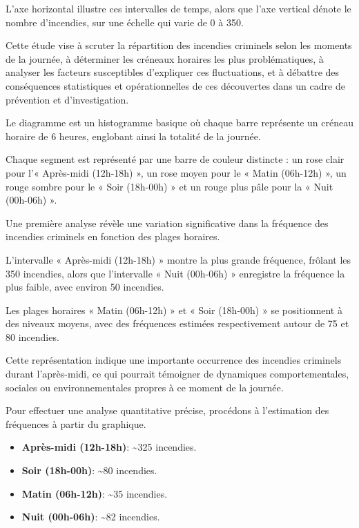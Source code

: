 \documentclass[
]{article}
\providecommand{\tightlist}{%
  \setlength{\itemsep}{0pt}\setlength{\parskip}{0pt}}
\begin{document}
L'axe horizontal illustre ces intervalles de temps, alors que l'axe
vertical dénote le nombre d'incendies, sur une échelle qui varie de 0 à
350.

Cette étude vise à scruter la répartition des incendies criminels selon
les moments de la journée, à déterminer les créneaux horaires les plus
problématiques, à analyser les facteurs susceptibles d'expliquer ces
fluctuations, et à débattre des conséquences statistiques et
opérationnelles de ces découvertes dans un cadre de prévention et
d'investigation.

Le diagramme est un histogramme basique où chaque barre représente un
créneau horaire de 6 heures, englobant ainsi la totalité de la journée.

Chaque segment est représenté par une barre de couleur distincte : un
rose clair pour l'« Après-midi (12h-18h) », un rose moyen pour le «
Matin (06h-12h) », un rouge sombre pour le « Soir (18h-00h) » et un
rouge plus pâle pour la « Nuit (00h-06h) ».

Une première analyse révèle une variation significative dans la
fréquence des incendies criminels en fonction des plages horaires.

L'intervalle « Après-midi (12h-18h) » montre la plus grande fréquence,
frôlant les 350 incendies, alors que l'intervalle « Nuit (00h-06h) »
enregistre la fréquence la plus faible, avec environ 50 incendies.

Les plages horaires « Matin (06h-12h) » et « Soir (18h-00h) » se
positionnent à des niveaux moyens, avec des fréquences estimées
respectivement autour de 75 et 80 incendies.

Cette représentation indique une importante occurrence des incendies
criminels durant l'après-midi, ce qui pourrait témoigner de dynamiques
comportementales, sociales ou environnementales propres à ce moment de
la journée.

Pour effectuer une analyse quantitative précise, procédons à
l'estimation des fréquences à partir du graphique.

\begin{itemize}
\tightlist
\item
  \textbf{Après-midi (12h-18h)}: \textasciitilde325 incendies.
\item
  \textbf{Soir (18h-00h)}: \textasciitilde80 incendies.
\item
  \textbf{Matin (06h-12h)}: \textasciitilde35 incendies.
\item
  \textbf{Nuit (00h-06h)}: \textasciitilde82 incendies.
\end{itemize}
\end{document}
